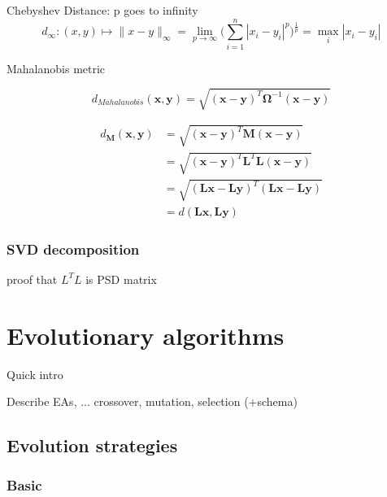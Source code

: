 \documentclass[12pt,a4paper]{report}
\begin{document}
Chebyshev Distance: p goes to infinity
\begin{equation}
d_{\mathbf{\infty}} : (x, y) \mapsto \|x-y\|_\infty = \lim_{p \rightarrow \infty}\bigg(\sum_{i=1}^{n} |x_i-y_i|^p\bigg)^\frac{1}{p} = \max_{i} |x_i-y_i|
\end{equation}

Mahalanobis metric

\begin{equation}
d_{Mahalanobis}(\textbf{x},\textbf{y}) = \sqrt{(\textbf{x}-\textbf{y})^T\bm{\Omega}^{-1}(\textbf{x}-\textbf{y})} 
\end{equation}

\cite{mahalanobis1936generalized}

\begin{align*}
  d_{\bm{M}}(\textbf{x},\textbf{y}) &= \sqrt{(\textbf{x}-\textbf{y})^{T}\bm{M}(\textbf{x}-\textbf{y})} \\
         &= \sqrt{(\textbf{x}-\textbf{y})^{T}\bm{L}^{T}\bm{L}(\textbf{x}-\textbf{y})} \\
         &= \sqrt{(\bm{L}\textbf{x}-\bm{L}\textbf{y})^{T}(\bm{L}\textbf{x}-\bm{L}\textbf{y})} \\
         &= d(\bm{L}\textbf{x}, \bm{L}\textbf{y})
\end{align*}

\subsection{SVD decomposition}

proof that $L^TL$ is PSD matrix



\chapter{Evolutionary algorithms} \label{chap:ea}

Quick intro

Describe EAs, ... crossover, mutation, selection (+schema)

\section{Evolution strategies} \label{chap:ea:es}
\subsection{Basic} \label{chap:ea:basic}
\end{document}

